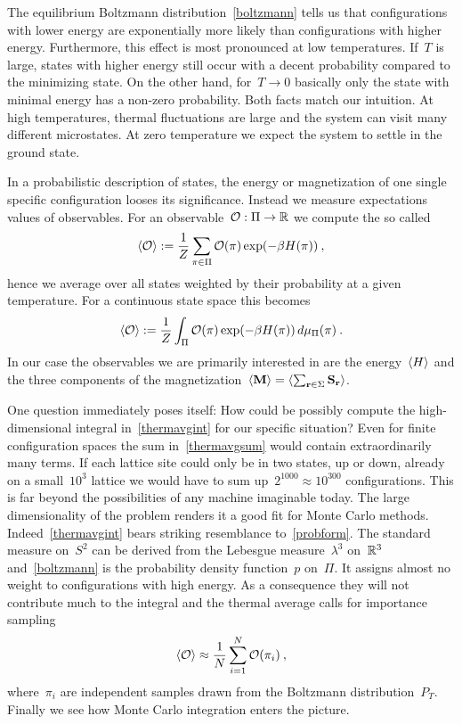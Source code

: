 The equilibrium Boltzmann distribution~\eqref{boltzmann} tells us that
configurations with lower energy are exponentially more likely than
configurations with higher energy. Furthermore, this effect is most pronounced
at low temperatures. If~$T$ is large, states with higher energy still occur with
a decent probability compared to the minimizing state. On the other hand, for~$T
\to 0$ basically only the state with minimal energy has a non-zero probability.
Both facts match our intuition. At high temperatures, thermal fluctuations are
large and the system can visit many different microstates. At zero temperature
we expect the system to settle in the ground state.

In a probabilistic description of states, the energy or magnetization of one
single specific configuration looses its significance. Instead we measure
expectations values of observables. For an observable~${\mathcal{O}}:{\Pi}\to{\mathbb{R}}$ we
compute the so called 
%
\begin{equation}\label{thermavgsum}
  \langle \mathcal{O} \rangle := \frac{1}{Z} \sum_{\pi \in \Pi} \mathcal{O}(\pi) \exp(- \beta H(\pi))\:,
\end{equation}
%
hence we average over all states weighted by their probability at a given
temperature. For a continuous state space this becomes
%
\begin{equation}\label{thermavgint}
  \langle \mathcal{O} \rangle := \frac{1}{Z} \int_{\Pi} \mathcal{O}(\pi) \exp(- \beta H(\pi))
    \,d\mu_{\Pi}(\pi)\:.
\end{equation}
%
In our case the observables we are primarily interested in are the
energy~$\langle H \rangle$ and the three components of the magnetization~$\langle \mathbf{M} \rangle =
\langle \sum_{\mathbf{r} \in \Sigma} \mathbf{S}_{\mathbf{r}} \rangle$.

One question immediately poses itself: How could be possibly compute the
high-dimensional integral in~\eqref{thermavgint} for our specific situation?
Even for finite configuration spaces the sum in~\eqref{thermavgsum} would
contain extraordinarily many terms. If each lattice site could only be in two
states, up or down, already on a small~$10^3$ lattice we would have to sum
up~$2^{1000} \approx 10^{300}$ configurations. This is far beyond the
possibilities of any machine imaginable today. The large dimensionality of the
problem renders it a good fit for Monte Carlo methods.
Indeed~\eqref{thermavgint} bears striking resemblance to~\eqref{probform}. The
standard measure on~$S^2$ can be derived from the Lebesgue measure~$\lambda^3$
on~$\mathbb{R}^3$ and~\eqref{boltzmann} is the probability density function~$p$
on~$\Pi$. It assigns almost no weight to configurations with high energy. As a
consequence they will not contribute much to the integral and the thermal
average calls for importance sampling
%
\begin{equation}\label{thermavgapprox}
  \langle \mathcal{O} \rangle \approx \frac{1}{N} \sum_{i = 1}^N \mathcal{O}(\pi_i)\:,
\end{equation}
%
where~$\pi_i$ are independent samples drawn from the Boltzmann
distribution~$P_T$. Finally we see how Monte Carlo integration enters the
picture.

